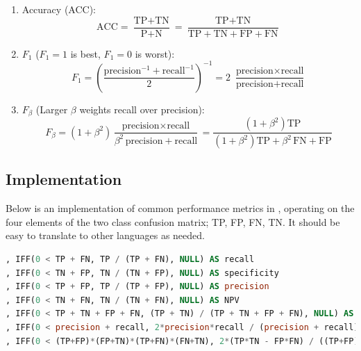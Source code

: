\begin{enumerate}[noitemsep]
  \item Accuracy (ACC):
\begin{equation} \label{eq:ACC}
\text{ACC} = \frac{\text{TP}+\text{TN}}{\text{P}+\text{N}} = \frac{\text{TP}+\text{TN}}{\text{TP}+\text{TN}+\text{FP}+\text{FN}}
\end{equation}

  \item $F_{1}$ ($F_{1}=1$ is best, $F_{1}=0$ is worst):
\begin{equation} \label{eq:F1}
F_{1} = \left(\frac{\text{precision}^{-1}+\text{recall}^{-1}}{2}\right)^{-1} = 2\,\,\frac{\text{precision} \times \text{recall}}{\text{precision} + \text{recall}}
\end{equation}

  \item $F_{\beta}$ (Larger $\beta$ weights recall over precision):
\begin{equation} \label{eq:Fbeta}
F_{\beta} = \left(1+\beta^{2}\right) \frac{\text{precision} \times \text{recall}}{\beta^{2}\,\text{precision} + \text{recall}} =
\frac{\left(1+\beta^{2}\right) \text{TP}}{\left(1+\beta^{2}\right) \text{TP} + \beta^{2}\,\text{FN} + \text{FP}}
\end{equation}
\end{enumerate}

\subsection{\sql Implementation}
\label{ml_general:eval:sql}

Below is an implementation of common performance metrics in \sql,
operating on the four elements of the two class confusion matrix; TP, FP, FN, TN.
It should be easy to translate to other languages as needed.

\begin{lstlisting}[language=SQL]
, IFF(0 < TP + FN, TP / (TP + FN), NULL) AS recall
, IFF(0 < TN + FP, TN / (TN + FP), NULL) AS specificity
, IFF(0 < TP + FP, TP / (TP + FP), NULL) AS precision
, IFF(0 < TN + FN, TN / (TN + FN), NULL) AS NPV
, IFF(0 < TP + TN + FP + FN, (TP + TN) / (TP + TN + FP + FN), NULL) AS accuracy
, IFF(0 < precision + recall, 2*precision*recall / (precision + recall), NULL) AS f1
, IFF(0 < (TP+FP)*(FP+TN)*(TP+FN)*(FN+TN), 2*(TP*TN - FP*FN) / ((TP+FP)*(FP+TN)*(TP+FN)*(FN+TN)), NULL) AS cohen_kappa
\end{lstlisting}

